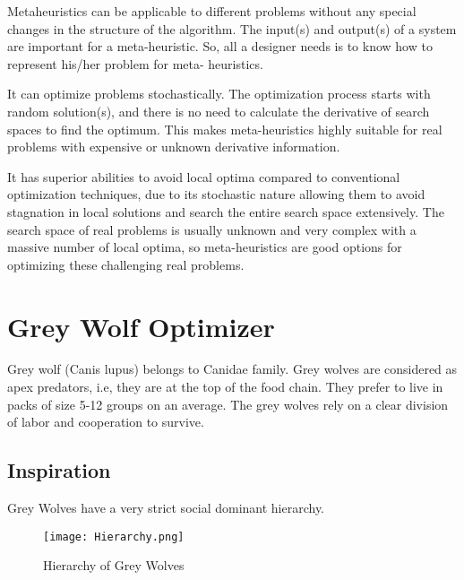 \documentclass[11pt]{report}
\begin{document}
\par Metaheuristics can be applicable to different problems without any special
changes in the structure of the algorithm. The input(s) and output(s) of a system are
important for a meta-heuristic. So, all a designer needs is to know how to represent his/her problem for meta-
heuristics.

\par It can optimize problems stochastically. The optimization process starts with random solution(s), and there is no need to calculate the derivative of search spaces to find the optimum. This makes meta-heuristics highly suitable for real problems with expensive or unknown derivative information.

\par It has superior abilities to avoid local optima compared to conventional optimization techniques, due to its stochastic nature allowing them to avoid stagnation in local solutions and search the entire search space extensively. The search space of real problems is usually unknown and very complex with a massive number of local optima, so meta-heuristics are good options for optimizing these challenging real problems.




\chapter{Grey Wolf Optimizer}
Grey wolf (Canis lupus) belongs to Canidae family. Grey wolves are considered as apex predators, i.e, they are at the top of the food chain. They  prefer to live in packs of size 5-12 groups on an average. The grey wolves rely on a clear division of labor and cooperation to survive. 

\section{Inspiration}
Grey Wolves have a very strict social dominant hierarchy.
\begin{center}

\begin{figure}[!hbt]
\centering
\texttt{[image: Hierarchy.png]}

\caption{Hierarchy of Grey Wolves}
\label{hierarchy}
\end{figure}

\end{center}
\end{document}
